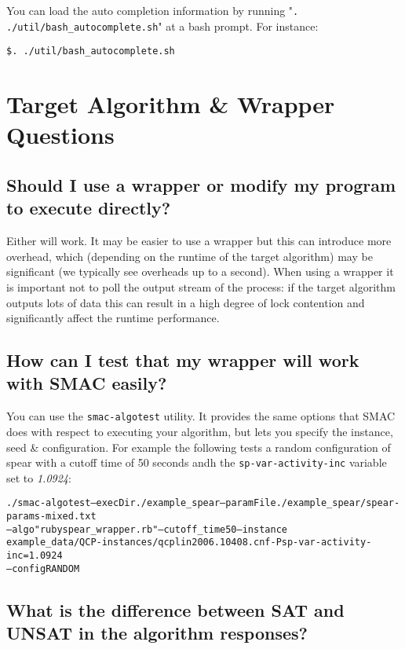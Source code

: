 \documentclass[11pt,letterpaper,oneside]{article}
\begin{document}
	You can load the auto completion information by running "\texttt{. ./util/bash\_autocomplete.sh}" at a bash prompt. For instance:
\begin{verbatim}
$. ./util/bash_autocomplete.sh
\end{verbatim}


\section{Target Algorithm \& Wrapper Questions}

\subsection{Should I use a wrapper or modify my program to execute directly?} 

	Either will work. It may be easier to use a wrapper but this can introduce more overhead, which (depending on the runtime of the target algorithm) may be significant (we typically see overheads up to a second). When using a wrapper it is important not to poll the output stream of the process: if the target algorithm outputs lots of data this can result in a high degree of lock contention and significantly affect the runtime performance.
	
\subsection{How can I test that my wrapper will work with SMAC easily?}
\label{sec:algotest}

You can use the \texttt{smac-algotest} utility. It provides the same options that SMAC does with respect to executing your algorithm, but lets you specify the instance, seed \& configuration. For example the following tests a random configuration of spear with a cutoff time of 50 seconds andh the \texttt{sp-var-activity-inc} variable set to \emph{1.0924}:

{\footnotesize
\begin{alltt}
./smac-algotest --execDir ./example_spear --paramFile ./example_spear/spear-params-mixed.txt
 --algo "ruby spear_wrapper.rb"  --cutoff_time 50  --instance
  example_data/QCP-instances/qcplin2006.10408.cnf -Psp-var-activity-inc=1.0924
--config RANDOM
\end{alltt}}


\subsection{What is the difference between SAT and UNSAT in the algorithm responses?}
\end{document}
